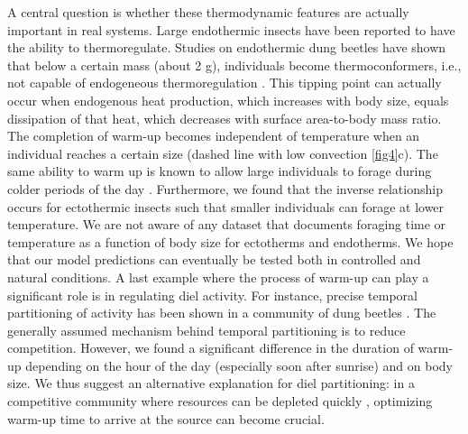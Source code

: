 A central question is whether these thermodynamic features are actually important in real systems.
Large endothermic insects have been reported to have the ability to thermoregulate.
Studies on endothermic dung beetles have shown that below a certain mass (about 2 g), individuals become thermoconformers, i.e., not capable of endogeneous thermoregulation \citep{Bartholomew1978, Verdu2006}.
This tipping point can actually occur when endogenous heat production, which increases with body size, equals dissipation of that heat, which decreases with surface area-to-body mass ratio.
The completion of warm-up becomes independent of temperature when an individual reaches a certain size (dashed line with low convection \cref{fig4}c).
The same ability to warm up is known to allow large individuals to forage during colder periods of the day \citep{May1985}.
Furthermore, we found that the inverse relationship occurs for ectothermic insects such that smaller individuals can forage at lower temperature.
We are not aware of any dataset that documents foraging time or temperature as a function of body size for ectotherms and endotherms. %
We hope that our model predictions can eventually be tested both in controlled and natural conditions.
A last example where the process of warm-up can play a significant role is in regulating diel activity. %
For instance, precise temporal partitioning of activity has been shown in a community of dung beetles \citep{Halffter1966, Caveney1995}.
The generally assumed mechanism behind temporal partitioning is to reduce competition.
However, we found a significant difference in the duration of warm-up depending on the hour of the day (especially soon after sunrise) and on body size.
We thus suggest an alternative explanation for diel partitioning: in a competitive community where resources can be depleted quickly \citep{Hanski1991}, optimizing warm-up time to arrive at the source can become crucial.

